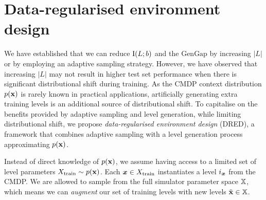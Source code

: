 \documentclass{article}
\theoremstyle{plain}
\newtheorem{proposition}[theorem]{Proposition}
\theoremstyle{definition}
\theoremstyle{remark}
\begin{document}
\section{Data-regularised environment design}\label{sec:ssed}
We have established that we can reduce $\text{I}(L;b)$ and the $\text{GenGap}$ by increasing $|L|$ or by employing an adaptive sampling strategy. However, we have observed that increasing $|L|$ may not result in higher test set performance when there is significant distributional shift during training. As the CMDP context distribution $p({\mathbf{x}})$ is rarely known in practical applications, artificially generating extra training levels is an additional source of distributional shift. To capitalise on the benefits provided by adaptive sampling and level generation, while limiting distributional shift, we propose \textit{data-regularised environment design} (DRED), a framework that combines adaptive sampling with a level generation process approximating $p({\mathbf{x}})$.

Instead of direct knowledge of $p({\mathbf{x}})$, we assume having access to a limited set of level parameters $X_\text{train} \sim p({\mathbf{x}})$. Each ${\bm{x}} \in X_\text{train}$ instantiates a level $i_{\bm{x}}$ from the CMDP. We are allowed to sample from the full simulator parameter space ${\mathbb{X}}$, which means we can \textit{augment} our set of training levels with new levels $\tilde{{\mathbf{x}}} \in {\mathbb{X}}$.

\end{document}
